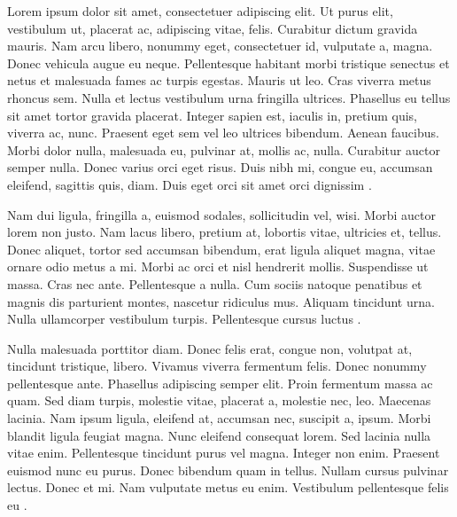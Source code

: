 \documentclass[a4paper,twoside,openright,11pt,final]{memoir}
\begin{document}
    \begin{pages}
        \begin{Leftside} 
            \beginnumbering
Lorem ipsum dolor sit amet, consectetuer adipiscing elit. Ut purus elit,
vestibulum ut, placerat ac, adipiscing vitae, felis. Curabitur dictum gravida
mauris. Nam arcu libero, nonummy eget, consectetuer id, vulputate a, magna.
Donec vehicula augue eu neque. Pellentesque habitant morbi tristique
senectus et netus et malesuada fames ac turpis egestas. Mauris ut leo. Cras
viverra metus rhoncus sem. Nulla et lectus vestibulum urna fringilla ultrices.
Phasellus eu tellus sit amet tortor gravida placerat. Integer sapien est, iaculis
in, pretium quis, viverra ac, nunc. Praesent eget sem vel leo ultrices bibendum.
Aenean faucibus. Morbi dolor nulla, malesuada eu, pulvinar at, mollis
 ac, nulla. Curabitur auctor semper nulla. Donec varius orci eget risus. Duis
nibh mi, congue eu, accumsan eleifend, sagittis quis, diam. Duis eget orci sit
amet orci dignissim .

Nam dui ligula, fringilla a, euismod sodales, sollicitudin vel, wisi. Morbi
auctor lorem non justo. Nam lacus libero, pretium at, lobortis vitae, ultricies
 et, tellus. Donec aliquet, tortor sed accumsan bibendum, erat ligula aliquet
magna, vitae ornare odio metus a mi. Morbi ac orci et nisl hendrerit mollis.
Suspendisse ut massa. Cras nec ante. Pellentesque a nulla. Cum sociis
natoque penatibus et magnis dis parturient montes, nascetur ridiculus mus.
Aliquam tincidunt urna. Nulla ullamcorper vestibulum turpis. Pellentesque
 cursus luctus .

Nulla malesuada porttitor diam. Donec felis erat, congue non, volutpat
at, tincidunt tristique, libero. Vivamus viverra fermentum felis. Donec nonummy
pellentesque ante. Phasellus adipiscing semper elit. Proin fermentum
massa ac quam. Sed diam turpis, molestie vitae, placerat a, molestie nec, leo.
 Maecenas lacinia. Nam ipsum ligula, eleifend at, accumsan nec, suscipit a,
ipsum. Morbi blandit ligula feugiat magna. Nunc eleifend consequat lorem.
Sed lacinia nulla vitae enim. Pellentesque tincidunt purus vel magna. Integer
non enim. Praesent euismod nunc eu purus. Donec bibendum quam in tellus.
Nullam cursus pulvinar lectus. Donec et mi. Nam vulputate metus eu enim.
 Vestibulum pellentesque felis eu .


\end{Leftside}
\end{pages}
\end{document}
